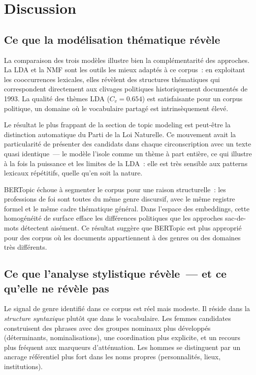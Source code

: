 \documentclass{article}
\begin{document}
\section{Discussion}
\label{sec:discussion}

\subsection{Ce que la modélisation thématique révèle}

La comparaison des trois modèles illustre bien la complémentarité des approches.
La LDA et la NMF sont les outils les mieux adaptés à ce corpus~: en exploitant
les cooccurrences lexicales, elles révèlent des structures thématiques qui
correspondent directement aux clivages politiques historiquement documentés
de 1993. La qualité des thèmes LDA ($C_v = 0.654$) est satisfaisante pour un
corpus politique, un domaine où le vocabulaire partagé est intrinsèquement
élevé.

Le résultat le plus frappant de la section de topic modeling est peut-être
la distinction automatique du Parti de la Loi Naturelle. Ce mouvement avait
la particularité de présenter des candidats dans chaque circonscription avec
un texte quasi identique~--- le modèle l'isole comme un thème à part entière,
ce qui illustre à la fois la puissance et les limites de la LDA~: elle est
très sensible aux patterns lexicaux répétitifs, quelle qu'en soit la nature.

BERTopic échoue à segmenter le corpus pour une raison structurelle~: les
professions de foi sont toutes du même genre discursif, avec le même registre
formel et le même cadre thématique général. Dans l'espace des embeddings, cette
homogénéité de surface efface les différences politiques que les approches
sac-de-mots détectent aisément. Ce résultat suggère que BERTopic est plus
approprié pour des corpus où les documents appartiennent à des genres ou des
domaines très différents.

\subsection{Ce que l'analyse stylistique révèle~--- et ce qu'elle ne révèle pas}

Le signal de genre identifié dans ce corpus est réel mais modeste.
Il réside dans la \emph{structure syntaxique} plutôt que dans le vocabulaire.
Les femmes candidates construisent des phrases avec des groupes nominaux plus
développés (déterminants, nominalisations), une coordination plus explicite,
et un recours plus fréquent aux marqueurs d'atténuation.
Les hommes se distinguent par un ancrage référentiel plus fort dans les noms
propres (personnalités, lieux, institutions).
\end{document}
